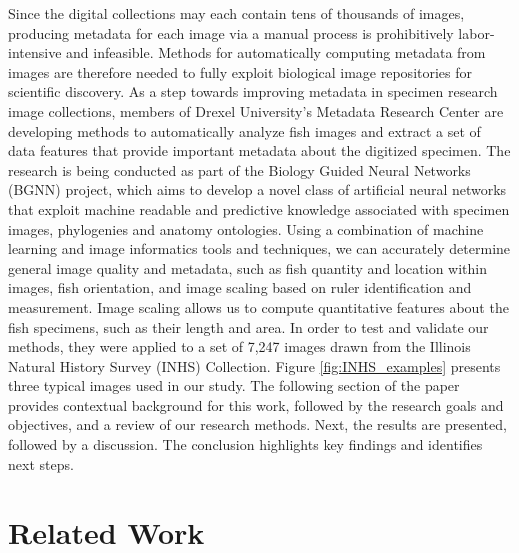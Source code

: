 \documentclass[conference]{IEEEtran}
\begin{document}
Since the digital collections may each contain tens of thousands of images, producing metadata for each image via a manual process is prohibitively labor-intensive and infeasible. Methods for automatically computing metadata from images are therefore needed to fully exploit biological image repositories for scientific discovery.
As a step towards improving metadata in specimen research image collections, members of Drexel University's Metadata Research Center are developing methods to automatically analyze fish images and
extract a set of data features that provide important metadata about the
digitized specimen.
The research is being conducted as part of the Biology Guided Neural Networks (BGNN) project, which aims to develop a novel class of artificial neural networks that exploit machine readable and predictive knowledge associated with specimen images, phylogenies and anatomy ontologies.
Using a combination of machine learning and image informatics tools and techniques, we can accurately determine general image quality and metadata, such as fish quantity and location within images, fish orientation, and
image scaling based on ruler identification and measurement. Image scaling
allows us to compute quantitative features about the fish specimens, such
as their length and area.  In order to test and validate our methods, they
were  applied to a set of 7,247
images drawn from the Illinois Natural History Survey (INHS) Collection.
Figure \ref{fig:INHS_examples} presents three typical images used in our
study.
The following section of the paper provides contextual background for this work, followed by the research goals and objectives, and a review of our research methods. Next, the results are presented, followed by a discussion. The conclusion highlights key findings and identifies next steps.

\section{Related Work}
\end{document}
